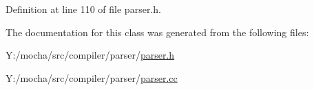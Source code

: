 Definition at line 110 of file parser.h.



The documentation for this class was generated from the following files:\begin{DoxyCompactItemize}
\item 
Y:/mocha/src/compiler/parser/\hyperlink{parser_8h}{parser.h}\item 
Y:/mocha/src/compiler/parser/\hyperlink{parser_8cc}{parser.cc}\end{DoxyCompactItemize}
